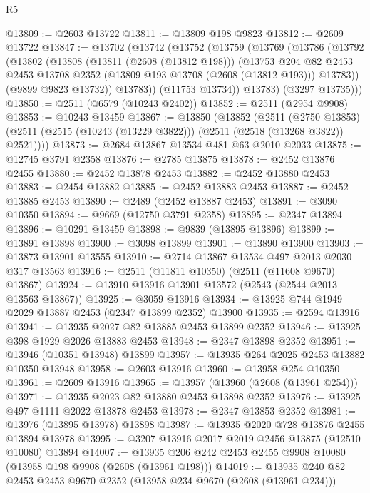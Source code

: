 \begin{lexlean}{R5}
\begin{coremodule}
@13809 := @2603 @13722
@13811 := @13809 @198 @9823
@13812 := @2609 @13722
@13847 := @13702
    (@13742
      (@13752
        (@13759
          (@13769
            (@13786
              (@13792
                (@13802
                  (@13808
                    (@13811 (@2608 (@13812 @198)))
                    (@13753
                      @204
                      @82
                      @2453
                      @2453
                      @13708
                      @2352
                      (@13809 @193 @13708 (@2608 (@13812 @193)))
                      @13783))
                  (@9899 @9823 @13732))
                @13783))
            (@11753 @13734))
          @13783)
        (@3297 @13735)))
@13850 := @2511 (@6579 (@10243 @2402))
@13852 := @2511 (@2954 @9908)
@13853 := @10243 @13459
@13867 := @13850
    (@13852
      (@2511
        (@2750 @13853)
        (@2511 (@2515 (@10243 (@13229 @3822))) (@2511 (@2518 (@13268 @3822)) @2521))))
@13873 := @2684 @13867 @13534 @481 @63 @2010 @2033
@13875 := @12745 @3791 @2358
@13876 := @2785 @13875
@13878 := @2452 @13876 @2455
@13880 := @2452 @13878 @2453
@13882 := @2452 @13880 @2453
@13883 := @2454 @13882
@13885 := @2452 @13883 @2453
@13887 := @2452 @13885 @2453
@13890 := @2489 (@2452 @13887 @2453)
@13891 := @3090 @10350
@13894 := @9669 (@12750 @3791 @2358)
@13895 := @2347 @13894
@13896 := @10291 @13459
@13898 := @9839 (@13895 @13896)
@13899 := @13891 @13898
@13900 := @3098 @13899
@13901 := @13890 @13900
@13903 := @13873 @13901 @13555
@13910 := @2714 @13867 @13534 @497 @2013 @2030 @317 @13563
@13916 := @2511 (@11811 @10350) (@2511 (@11608 @9670) @13867)
@13924 := @13910 @13916 @13901 @13572 (@2543 (@2544 @2013 @13563 @13867))
@13925 := @3059 @13916
@13934 := @13925 @744 @1949 @2029 @13887 @2453 (@2347 @13899 @2352) @13900
@13935 := @2594 @13916
@13941 := @13935 @2027 @82 @13885 @2453 @13899 @2352
@13946 := @13925 @398 @1929 @2026 @13883 @2453
@13948 := @2347 @13898 @2352
@13951 := @13946 (@10351 @13948) @13899
@13957 := @13935 @264 @2025 @2453 @13882 @10350 @13948
@13958 := @2603 @13916
@13960 := @13958 @254 @10350
@13961 := @2609 @13916
@13965 := @13957 (@13960 (@2608 (@13961 @254)))
@13971 := @13935 @2023 @82 @13880 @2453 @13898 @2352
@13976 := @13925 @497 @1111 @2022 @13878 @2453
@13978 := @2347 @13853 @2352
@13981 := @13976 (@13895 @13978) @13898
@13987 := @13935 @2020 @728 @13876 @2455 @13894 @13978
@13995 := @3207 @13916 @2017 @2019 @2456 @13875 (@12510 @10080) @13894
@14007 := @13935 @206 @242 @2453 @2455 @9908 @10080 (@13958 @198 @9908 (@2608 (@13961 @198)))
@14019 := @13935 @240 @82 @2453 @2453 @9670 @2352 (@13958 @234 @9670 (@2608 (@13961 @234)))

\end{coremodule}
\end{lexlean}

